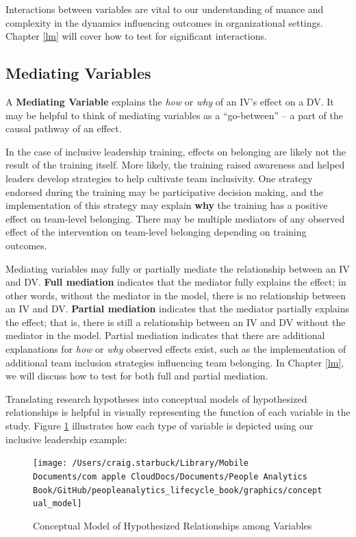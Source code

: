 \documentclass[]{book}
\begin{document}
Interactions between variables are vital to our understanding of nuance and complexity in the dynamics influencing outcomes in organizational settings. Chapter \ref{lm} will cover how to test for significant interactions.

\hypertarget{mediating-variables}{%
\subsection{Mediating Variables}\label{mediating-variables}}

A \textbf{Mediating Variable} explains the \emph{how} or \emph{why} of an IV's effect on a DV. It may be helpful to think of mediating variables as a ``go-between'' -- a part of the causal pathway of an effect.

In the case of inclusive leadership training, effects on belonging are likely not the result of the training itself. More likely, the training raised awareness and helped leaders develop strategies to help cultivate team inclusivity. One strategy endorsed during the training may be participative decision making, and the implementation of this strategy may explain \textbf{why} the training has a positive effect on team-level belonging. There may be multiple mediators of any observed effect of the intervention on team-level belonging depending on training outcomes.

Mediating variables may fully or partially mediate the relationship between an IV and DV. \textbf{Full mediation} indicates that the mediator fully explains the effect; in other words, without the mediator in the model, there is no relationship between an IV and DV. \textbf{Partial mediation} indicates that the mediator partially explains the effect; that is, there is still a relationship between an IV and DV without the mediator in the model. Partial mediation indicates that there are additional explanations for \emph{how} or \emph{why} observed effects exist, such as the implementation of additional team inclusion strategies influencing team belonging. In Chapter \ref{lm}, we will discuss how to test for both full and partial mediation.

Translating research hypotheses into conceptual models of hypothesized relationships is helpful in visually representing the function of each variable in the study. Figure \ref{fig:concept-mdl} illustrates how each type of variable is depicted using our inclusive leadership example:

\begin{figure}

{\centering \texttt{[image: /Users/craig.starbuck/Library/Mobile Documents/com~apple~CloudDocs/Documents/People Analytics Book/GitHub/peopleanalytics\_lifecycle\_book/graphics/conceptual\_model]} 

}

\caption{Conceptual Model of Hypothesized Relationships among Variables}\label{fig:concept-mdl}
\end{figure}
\end{document}
